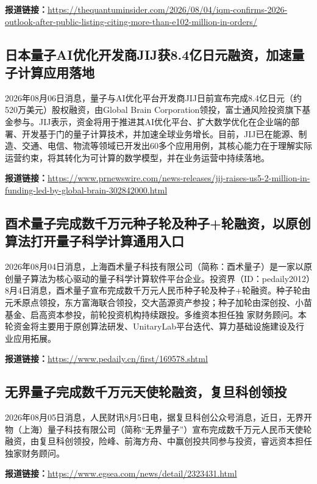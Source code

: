 \documentclass[12pt,a4paper]{ctexart}
\begin{document}
\noindent\textbf{报道链接：}\url{https://thequantuminsider.com/2026/08/04/iqm-confirms-2026-outlook-after-public-listing-citing-more-than-e102-million-in-orders/}

\subsection{ 日本量子AI优化开发商JIJ获8.4亿日元融资，加速量子计算应用落地 }

2026年08月06日消息，量子与AI优化平台开发商JIJ日前宣布完成8.4亿日元（约520万美元）股权融资，由Global Brain Corporation领投，富士通风险投资旗下基金参与。JIJ表示，资金将用于推进其AI优化平台、扩大数学优化在企业端的部署、开发基于门的量子计算技术，并加速全球业务增长。目前，JIJ已在能源、制造、交通、电信、物流等领域已开发出60多个应用用例，其核心能力在于理解实际运营约束，将其转化为可计算的数学模型，并在业务运营中持续落地。

\noindent\textbf{报道链接：}\url{https://www.prnewswire.com/news-releases/jij-raises-us5-2-million-in-funding-led-by-global-brain-302842000.html}

\subsection{ 酉术量子完成数千万元种子轮及种子+轮融资，以原创算法打开量子科学计算通用入口 }

2026年08月04日消息，上海酉术量子科技有限公司（简称：酉术量子）是一家以原创量子算法为核心驱动的量子科学计算软件平台企业。投资界（ID：pedaily2012）8月4日消息，酉术量子宣布完成数千万元人民币种子轮及种子+轮融资。种子轮由元禾原点领投，东方富海联合领投，交大菡源资产参投；种子加轮由深创投、小苗基金、启高资本参投，前轮投资机构持续跟投。多维资本担任独 家财务顾问。本轮资金将主要用于原创算法研发、UnitaryLab平台迭代、算力基础设施建设及行业应用拓展。

\noindent\textbf{报道链接：}\url{https://www.pedaily.cn/first/169578.shtml}

\subsection{ 无界量子完成数千万元天使轮融资，复旦科创领投 }

2026年08月05日消息，人民财讯8月5日电，据复旦科创公众号消息，近日，无界开物（上海）量子科技有限公司（简称“无界量子”）宣布完成数千万元人民币天使轮融资，由复旦科创领投，险峰、前海方舟、中赢创投共同参与投资，睿远资本担任独家财务顾问。

\noindent\textbf{报道链接：}\url{https://www.egsea.com/news/detail/2323431.html}
\end{document}
